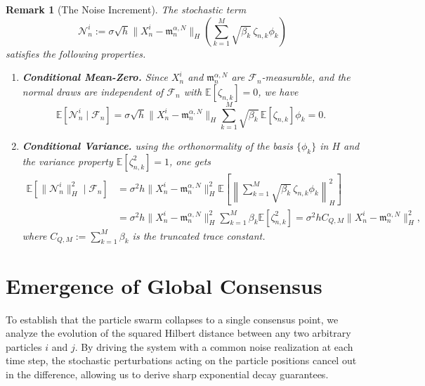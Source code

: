 \documentclass[12pt]{amsart}
\numberwithin{equation}{section}
\newtheorem{remark}[theorem]{Remark}
\begin{document}
\begin{remark}[The Noise Increment]\label{rmk: noise}
The stochastic term 
\[
\mathcal{N}_n^i := \sigma \sqrt{h} \|X_n^i - \mathfrak{m}_n^{\alpha, N}\|_H \left( \sum_{k=1}^M \sqrt{\beta_k}\, \zeta_{n,k} \phi_k \right)
\]
satisfies the following properties.
\begin{enumerate}
    \item \textbf{Conditional Mean-Zero.} Since $X_n^i$ and $\mathfrak{m}_n^{\alpha, N}$ are $\mathcal{F}_n$-measurable, and the normal draws are independent of $\mathcal{F}_n$ with $\mathbb{E}[\zeta_{n,k}] = 0$, we have
    \begin{equation*}
        \mathbb{E}[\mathcal{N}_n^i \mid \mathcal{F}_n] = \sigma \sqrt{h} \|X_n^i - \mathfrak{m}_n^{\alpha, N}\|_H \sum_{k=1}^M \sqrt{\beta_k}\, \mathbb{E}[\zeta_{n,k}] \phi_k = 0.
    \end{equation*}
    \item \textbf{Conditional Variance.} using the orthonormality of the basis $\{\phi_k\}$ in $H$ and the variance property $\mathbb{E}[\zeta_{n,k}^2] = 1$, one gets
    \begin{align*}
        \mathbb{E}[\|\mathcal{N}_n^i\|_H^2 \mid \mathcal{F}_n] &= \sigma^2 h \|X_n^i - \mathfrak{m}_n^{\alpha, N}\|_H^2 \mathbb{E} \left[ \left\| \sum_{k=1}^M \sqrt{\beta_k}\, \zeta_{n,k} \phi_k \right\|_H^2 \right]  \\
        &= \sigma^2 h \|X_n^i - \mathfrak{m}_n^{\alpha, N}\|_H^2 \sum_{k=1}^M \beta_k \mathbb{E}[\zeta_{n,k}^2] 
        = \sigma^2 h C_{Q,M} \|X_n^i - \mathfrak{m}_n^{\alpha, N}\|_H^2,
    \end{align*}
    where $C_{Q,M} := \sum_{k=1}^M \beta_k$ is the truncated trace constant.
\end{enumerate}
\end{remark}




\section{Emergence of Global Consensus}\label{sec:consensus}

To establish that the particle swarm collapses to a single consensus point, we analyze the evolution of the squared Hilbert distance between any two arbitrary particles $i$ and $j$. By driving the system with a common noise realization at each time step, the stochastic perturbations acting on the particle positions cancel out in the difference, allowing us to derive sharp exponential decay guarantees.
\end{document}
